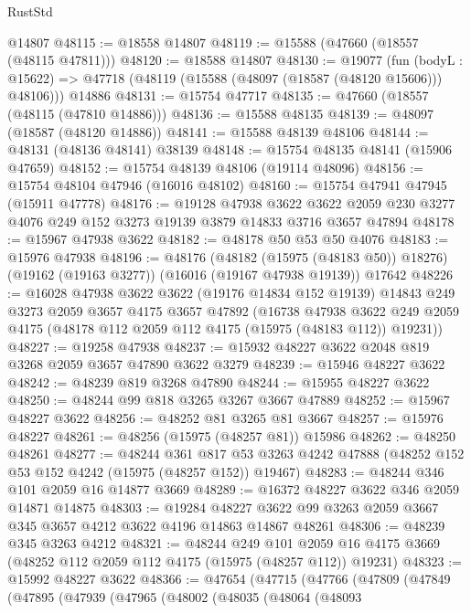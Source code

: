 \begin{lexlean}{RustStd}
\begin{coremodule}
    @14807
@48115 := @18558 @14807
@48119 := @15588 (@47660 (@18557 (@48115 @47811)))
@48120 := @18588 @14807
@48130 := @19077
    (fun (bodyL : @15622) => @47718 (@48119 (@15588 (@48097 (@18587 (@48120 @15606))) @48106)))
    @14886
@48131 := @15754 @47717
@48135 := @47660 (@18557 (@48115 (@47810 @14886)))
@48136 := @15588 @48135
@48139 := @48097 (@18587 (@48120 @14886))
@48141 := @15588 @48139 @48106
@48144 := @48131 (@48136 @48141) @38139
@48148 := @15754 @48135 @48141 (@15906 @47659)
@48152 := @15754 @48139 @48106 (@19114 @48096)
@48156 := @15754 @48104 @47946 (@16016 @48102)
@48160 := @15754 @47941 @47945 (@15911 @47778)
@48176 := @19128
    @47938
    @3622
    @3622
    @2059
    @230
    @3277
    @4076
    @249
    @152
    @3273
    @19139
    @3879
    @14833
    @3716
    @3657
    @47894
@48178 := @15967 @47938 @3622
@48182 := @48178 @50 @53 @50 @4076
@48183 := @15976 @47938
@48196 := @48176
    (@48182 (@15975 (@48183 @50)) @18276)
    (@19162 (@19163 @3277))
    (@16016 (@19167 @47938 @19139))
    @17642
@48226 := @16028
    @47938
    @3622
    @3622
    (@19176 @14834 @152 @19139)
    @14843
    @249
    @3273
    @2059
    @3657
    @4175
    @3657
    @47892
    (@16738
      @47938
      @3622
      @249
      @2059
      @4175
      (@48178 @112 @2059 @112 @4175 (@15975 (@48183 @112)) @19231))
@48227 := @19258 @47938
@48237 := @15932 @48227 @3622 @2048 @819 @3268 @2059 @3657 @47890 @3622 @3279
@48239 := @15946 @48227 @3622
@48242 := @48239 @819 @3268 @47890
@48244 := @15955 @48227 @3622
@48250 := @48244 @99 @818 @3265 @3267 @3667 @47889
@48252 := @15967 @48227 @3622
@48256 := @48252 @81 @3265 @81 @3667
@48257 := @15976 @48227
@48261 := @48256 (@15975 (@48257 @81)) @15986
@48262 := @48250 @48261
@48277 := @48244
    @361
    @817
    @53
    @3263
    @4242
    @47888
    (@48252 @152 @53 @152 @4242 (@15975 (@48257 @152)) @19467)
@48283 := @48244 @346 @101 @2059 @16 @14877 @3669
@48289 := @16372 @48227 @3622 @346 @2059 @14871 @14875
@48303 := @19284
    @48227
    @3622
    @99
    @3263
    @2059
    @3667
    @345
    @3657
    @4212
    @3622
    @4196
    @14863
    @14867
    @48261
@48306 := @48239 @345 @3263 @4212
@48321 := @48244
    @249
    @101
    @2059
    @16
    @4175
    @3669
    (@48252 @112 @2059 @112 @4175 (@15975 (@48257 @112)) @19231)
@48323 := @15992 @48227 @3622
@48366 := @47654
    (@47715
      (@47766
        (@47809
          (@47849
            (@47895
              (@47939
                (@47965
                  (@48002
                    (@48035
                      (@48064
                        (@48093

\end{coremodule}
\end{lexlean}
